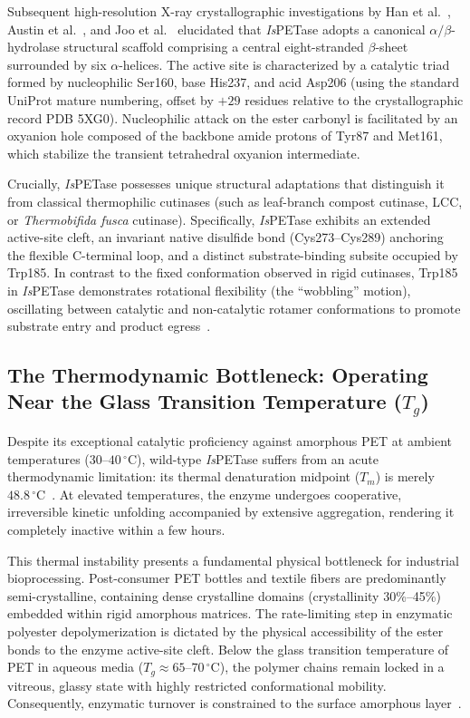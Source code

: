 \documentclass[10pt,twocolumn,a4paper]{article}
\begin{document}
Subsequent high-resolution X-ray crystallographic investigations by Han et al.~\cite{Han2017}, Austin et al.~\cite{Austin2018}, and Joo et al.~\cite{Joo2018} elucidated that \textit{Is}PETase adopts a canonical $\alpha/\beta$-hydrolase structural scaffold comprising a central eight-stranded $\beta$-sheet surrounded by six $\alpha$-helices. The active site is characterized by a catalytic triad formed by nucleophilic Ser160, base His237, and acid Asp206 (using the standard UniProt mature numbering, offset by $+29$ residues relative to the crystallographic record PDB 5XG0). Nucleophilic attack on the ester carbonyl is facilitated by an oxyanion hole composed of the backbone amide protons of Tyr87 and Met161, which stabilize the transient tetrahedral oxyanion intermediate.

Crucially, \textit{Is}PETase possesses unique structural adaptations that distinguish it from classical thermophilic cutinases (such as leaf-branch compost cutinase, LCC, or \textit{Thermobifida fusca} cutinase). Specifically, \textit{Is}PETase exhibits an extended active-site cleft, an invariant native disulfide bond (Cys273--Cys289) anchoring the flexible C-terminal loop, and a distinct substrate-binding subsite occupied by Trp185. In contrast to the fixed conformation observed in rigid cutinases, Trp185 in \textit{Is}PETase demonstrates rotational flexibility (the ``wobbling'' motion), oscillating between catalytic and non-catalytic rotamer conformations to promote substrate entry and product egress~\cite{Han2017,Austin2018}.

\subsection{The Thermodynamic Bottleneck: Operating Near the Glass Transition Temperature ($T_g$)}
Despite its exceptional catalytic proficiency against amorphous PET at ambient temperatures ($30\text{--}40\,^\circ\text{C}$), wild-type \textit{Is}PETase suffers from an acute thermodynamic limitation: its thermal denaturation midpoint ($T_m$) is merely $48.8\,^\circ\text{C}$~\cite{Son2019,Cui2021}. At elevated temperatures, the enzyme undergoes cooperative, irreversible kinetic unfolding accompanied by extensive aggregation, rendering it completely inactive within a few hours.

This thermal instability presents a fundamental physical bottleneck for industrial bioprocessing. Post-consumer PET bottles and textile fibers are predominantly semi-crystalline, containing dense crystalline domains (crystallinity 30\%–45\%) embedded within rigid amorphous matrices. The rate-limiting step in enzymatic polyester depolymerization is dictated by the physical accessibility of the ester bonds to the enzyme active-site cleft. Below the glass transition temperature of PET in aqueous media ($T_g \approx 65\text{--}70\,^\circ\text{C}$), the polymer chains remain locked in a vitreous, glassy state with highly restricted conformational mobility. Consequently, enzymatic turnover is constrained to the surface amorphous layer~\cite{Ronkvist2009,Kawai2019}.
\end{document}
